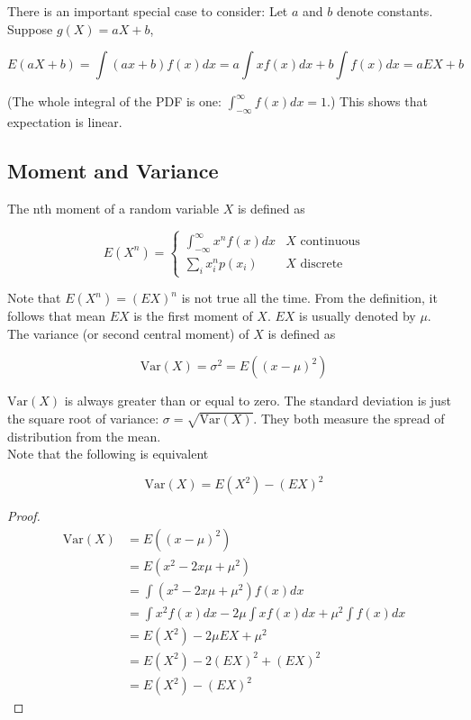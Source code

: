 \documentclass[12pt, a4paper]{article}
\begin{document}
There is an important special case to consider: Let $a$ and $b$ denote constants. Suppose $g(X)=aX+b$,

\[ E(aX+b)=\int (ax+b)f(x)dx=a\int xf(x)dx+b\int f(x) dx = aEX+b \]

(The whole integral of the PDF is one: $\int_{-\infty}^\infty f(x) dx=1$.) This shows that expectation is linear.

\subsection{Moment and Variance}

The nth moment of a random variable $X$ is defined as

\[ E(X^n)=\begin{cases} \displaystyle\int_{-\infty}^\infty x^n f(x) dx & \text{$X$ continuous} \\[20pt] \displaystyle\sum_i x_i^n p(x_i) & \text{$X$ discrete} \end{cases} \]

Note that $E(X^n) = (EX)^n$ is not true all the time. From the definition, it follows that mean $EX$ is the first moment of $X$. $EX$ is usually denoted by $\mu$. \\

The variance (or second central moment) of $X$ is defined as

\[ \text{Var}(X)=\sigma^2=E((x-\mu)^2) \]

$\text{Var}(X)$ is always greater than or equal to zero. The standard deviation is just the square root of variance: $\sigma=\sqrt{\text{Var}(X)}$. They both measure the spread of distribution from the mean. \\

Note that the following is equivalent

\[ \text{Var}(X)=E(X^2)-(EX)^2 \]

\begin{proof}
\begin{align*}
\text{Var}(X)&=E((x-\mu)^2) \\
&=E(x^2-2x\mu+\mu^2) \\
&=\int (x^2-2x\mu+\mu^2) f(x) dx \\
&=\int x^2 f(x) dx -2\mu\int xf(x) dx + \mu^2 \int f(x) dx \\
&=E(X^2)-2\mu EX + \mu^2 \\
&=E(X^2)-2(EX)^2+(EX)^2 \\
&=E(X^2)-(EX)^2
\end{align*}
\end{proof}
\end{document}
